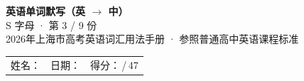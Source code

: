 \documentclass[10pt,a4paper]{article}
\begin{document}
\pagestyle{plain}

\begin{center}
{\LARGE\bfseries 英语单词默写（英 $\to$ 中）}\\[0.22em]
{\large S 字母 · 第 3 / 9 份}\\[0.18em]
{\small 2026年上海市高考英语词汇用法手册 · 参照普通高中英语课程标准}
\end{center}

\vspace{0.25em}
\noindent\begin{tabular}{@{}p{}@{}p{}@{}p{}@{}}
姓名：\underline{\hspace{2.0cm}} & 日期：\underline{\hspace{2.0cm}} & 得分：\underline{\hspace{1.3cm}}\,/\,47 \\
\end{tabular}

\vspace{0.3em}

\vspace{0.08em}
\end{document}
